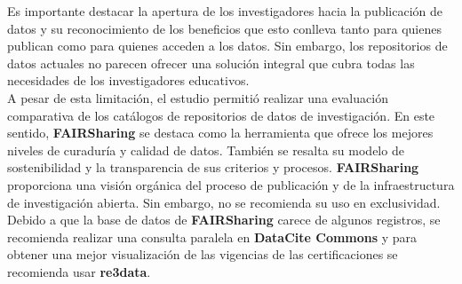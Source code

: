 \documentclass[runningheads]{llncs}
\begin{document}


Es importante destacar la apertura de los investigadores hacia la publicación de datos y su reconocimiento de los beneficios que esto conlleva tanto para quienes publican como para quienes acceden a los datos. Sin embargo, los repositorios de datos actuales no parecen ofrecer una solución integral que cubra todas las necesidades de los investigadores educativos. \\

A pesar de esta limitación, el estudio permitió realizar una evaluación comparativa de los catálogos de repositorios de datos de investigación. En este sentido, \textbf{FAIRSharing} se destaca como la herramienta que ofrece los mejores niveles de curaduría y calidad de datos. También se resalta su modelo de sostenibilidad y la transparencia de sus criterios y procesos. \textbf{FAIRSharing} proporciona una visión orgánica del proceso de publicación y de la infraestructura de investigación abierta. Sin embargo, no se recomienda su uso en exclusividad. Debido a que la base de datos de \textbf{FAIRSharing} carece de algunos registros, se recomienda realizar una consulta paralela en \textbf{DataCite Commons} y para obtener una mejor visualización de las vigencias de las certificaciones se recomienda usar \textbf{re3data}.\\

\end{document}

